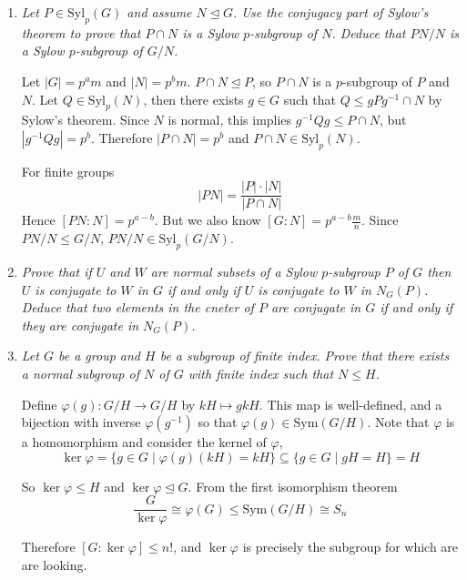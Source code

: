 \documentclass[letterpaper, 11pt]{article}
\newcommand{\Sym}{\text{Sym}}
\newcommand{\Syl}{\text{Syl}}
\begin{document}
\begin{enumerate}
\item \emph{Let $P \in \Syl_p(G)$ and assume $N \unlhd G$.  Use the conjugacy part of Sylow's theorem to prove that $P \cap N$ is a Sylow $p$-subgroup of $N$.  Deduce that $PN/N$ is a Sylow $p$-subgroup of $G/N$.}

Let $|G| = p^a m$ and $|N| = p^bm$. $P \cap N \unlhd P$, so $P \cap N$ is a $p$-subgroup of $P$ and $N$.  Let $Q \in \Syl_p(N)$, then there exists $g \in G$ such that $Q \leq gPg^{-1} \cap N$ by Sylow's theorem.  Since $N$ is normal, this implies $g^{-1}Qg \leq P \cap N$, but $\left|g^{-1}Qg\right| = p^b$.  Therefore $|P \cap N| = p^b$ and $P \cap N \in \Syl_p(N)$.

For finite groups $$|PN| = \frac{|P|\cdot|N|}{|P \cap N|}$$  Hence $[PN : N] = p^{a-b}$.  But we also know $[G : N] = p^{a-b} \frac{m}{n}$.  Since $PN/N \leq G/N$, $PN/N \in \Syl_p(G/N)$.

\item \emph{Prove that if $U$ and $W$ are normal subsets of a Sylow $p$-subgroup $P$ of $G$ then $U$ is conjugate to $W$ in $G$ if and only if $U$ is conjugate to $W$ in $N_G(P)$.  Deduce that two elements in the cneter of $P$ are conjugate in $G$ if and only if they are conjugate in $N_G(P)$.}

\item \emph{Let $G$ be a group and $H$ be a subgroup of finite index.  Prove that there exists a normal subgroup of $N$ of $G$ with finite index such that $N \leq H$.}

Define $\varphi(g): G/H \rightarrow G/H$ by $kH \mapsto gkH$.  This map is well-defined, and a bijection with inverse $\varphi\left(g^{-1}\right)$ so that $\varphi(g) \in \Sym(G/H)$.  Note that $\varphi$ is a homomorphism and consider the kernel of $\varphi$,
\[
\ker \varphi = \{g \in G \mid \varphi(g)(kH) = kH \} \subseteq \{g \in G \mid gH = H \} = H
\]

So $\ker \varphi \leq H$ and $\ker \varphi \unlhd G$. From the first isomorphism theorem
\[
\frac{G}{\ker \varphi} \cong \varphi\left(G\right) \leq \Sym(G/H) \cong S_n
\]

Therefore $[G : \ker \varphi] \leq n!$, and $\ker \varphi$ is precisely the subgroup for which are are looking.

\end{enumerate}
\end{document}
